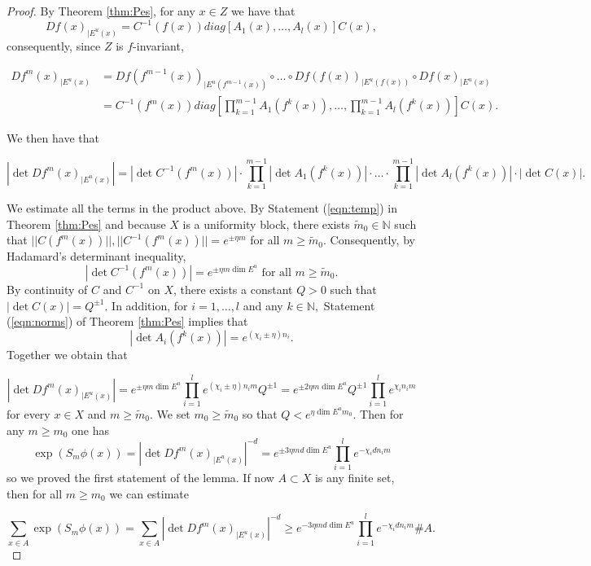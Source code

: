 \documentclass{amsart}
\theoremstyle{plain}
\theoremstyle{definition}
\theoremstyle{remark}
\numberwithin{equation}{section}
\begin{document}
\begin{proof}
By Theorem \ref{thm:Pes}, for any $x\in Z$ we have that
$$  Df(x)_{| E^u(x)} = C^{-1}(f(x))  diag[   A_1(x), \ldots  ,  A_l(x)] C(x),  $$
consequently, since $Z$ is $f$-invariant,


\begin{align*}
  Df^m(x)_{| E^u(x)} & =    Df(f^{m-1}(x))   _{| E^u(f^{m-1}(x))}  \circ   \ldots   \circ    Df(f(x))   _{| E^u(f(x))}   \circ    Df(x) _{| E^u(x)}   \\
&= C^{-1}(f^m(x))  diag[  \prod_{k=1}^{m-1}  A_1(f^k(x)), \ldots  , \prod_{k=1}^{m-1}  A_l(f^k(x))] C(x).
\end{align*}



We then have that

$$   | \det Df^m(x)_{| E^u(x)}  | =  |\det C^{-1}(f^m(x)) | \cdot   \prod_{k=1}^{m-1} |\det  A_1(f^k(x))|\cdot \ldots  \cdot \prod_{k=1}^{m-1}  | \det A_l(f^k(x)) | \cdot |\det C(x)|. $$

We estimate all the terms in the product above.
By Statement (\ref{eqn:temp}) in Theorem \ref{thm:Pes} and because $X$ is a uniformity block, there exists $\tilde{m}_0\in\mathbb{N}$ such that
 $||   C( f^m(x))||, ||C^{-1}( f^m(x))||=  e^{ \pm \eta m}$ for all $m\geq \tilde{m}_0$. Consequently, by Hadamard's determinant inequality,
$$    |\det C^{-1}(f^m(x)) | =  e^{ \pm \eta m   \dim E^u}  \text{ for all $m\geq \tilde{m}_0$}. $$
By continuity of $C$ and $C^{-1}$ on $X$, there exists a constant $Q>0$ such that $  |\det C(x)|   = Q^{\pm 1}. $
In addition, for $i=1,\ldots, l$ and any $k\in\mathbb{N},$ Statement (\ref{eqn:norms}) of Theorem \ref{thm:Pes} implies that 
$$  |\det A_i(f^k(x))|   = e^{(\chi_i \pm \eta) n_i}. $$
Together we obtain that 


$$     | \det Df^m(x)_{| E^u(x)}  | =  e^{ \pm \eta m   \dim E^u}   \prod_{i=1}^{l}   e^{(\chi_i \pm \eta) n_i   m } Q^{\pm 1}   
 =    e^{ \pm 2 \eta m   \dim E^u} Q^{\pm 1}    \prod_{i=1}^{l}   e^{\chi_i  n_i   m }  $$
for every $x\in X$ and $m\geq \tilde{m}_0$. We set $m_0\geq \tilde{m}_0$ so that $Q< e^{\eta \dim E^u m_0}.$
Then for any $m\geq m_0$ one has
$$     \exp (S_m\phi (x)) =   | \det Df^m(x)_{| E^u(x)}  | ^{-d} =     e^{  \pm 3 \eta m d   \dim E^u}     \prod_{i=1}^{l}   e^{-\chi_i    d n_i   m } $$
so we proved the first statement of the lemma.
If now $    A \subset X$ is any finite set, then for all $m\geq m_0$ we can estimate

$$  \sum_{x\in A} \exp (S_m\phi (x)) = \sum_{x\in A }    | \det Df^m(x)_{| E^u(x)}  | ^{-d}   \geq     e^{ -  3 \eta m d   \dim E^u}    \prod_{i=1}^{l}   e^{-\chi_i    d n_i   m }  \# A.   $$


\end{proof}
\end{document}
